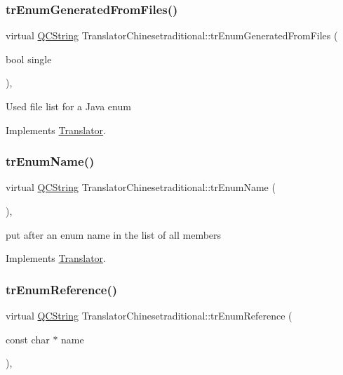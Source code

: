 \subsubsection{\texorpdfstring{trEnumGeneratedFromFiles()}{trEnumGeneratedFromFiles()}}
{\footnotesize\ttfamily virtual \mbox{\hyperlink{class_q_c_string}{Q\+C\+String}} Translator\+Chinesetraditional\+::tr\+Enum\+Generated\+From\+Files (\begin{DoxyParamCaption}\item[{bool}]{single }\end{DoxyParamCaption})\hspace{0.3cm}{\ttfamily [inline]}, {\ttfamily [virtual]}}

Used file list for a Java enum 

Implements \mbox{\hyperlink{class_translator}{Translator}}.

\mbox{\label{class_translator_chinesetraditional_a8709752d130f7edea050ea7daccf2cf1}} 
\subsubsection{\texorpdfstring{trEnumName()}{trEnumName()}}
{\footnotesize\ttfamily virtual \mbox{\hyperlink{class_q_c_string}{Q\+C\+String}} Translator\+Chinesetraditional\+::tr\+Enum\+Name (\begin{DoxyParamCaption}{ }\end{DoxyParamCaption})\hspace{0.3cm}{\ttfamily [inline]}, {\ttfamily [virtual]}}

put after an enum name in the list of all members 

Implements \mbox{\hyperlink{class_translator}{Translator}}.

\mbox{\label{class_translator_chinesetraditional_a89cf15997aee469596da4fb791eabbe9}} 
\subsubsection{\texorpdfstring{trEnumReference()}{trEnumReference()}}
{\footnotesize\ttfamily virtual \mbox{\hyperlink{class_q_c_string}{Q\+C\+String}} Translator\+Chinesetraditional\+::tr\+Enum\+Reference (\begin{DoxyParamCaption}\item[{const char $\ast$}]{name }\end{DoxyParamCaption})\hspace{0.3cm}{\ttfamily [inline]}, {\ttfamily [virtual]}}

